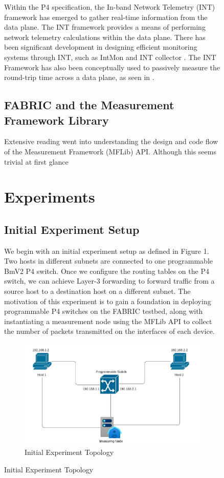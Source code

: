 \documentclass[conference]{IEEEtran}
\begin{document}
\begin{figure}[h!]
    Within the P4 specification, the In-band Network Telemetry (INT) framework \cite{b5} has emerged to gather real-time information from the data plane. The INT framework provides a means of performing network telemetry calculations within the data plane. There has been significant development in designing efficient monitoring systems through INT, such as IntMon \cite{b6} and INT collector \cite{b7}. The INT Framework has also been conceptually used to passively measure the round-trip time across a data plane, as seen in \cite{b8}.

    \subsection{FABRIC and the Measurement Framework Library}
    Extensive reading went into understanding the design and code flow of the Measurement Framework (MFLib) API. Although this seems trivial at first glance

    \section{Experiments}
    \subsection{Initial Experiment Setup}
    We begin with an initial experiment setup as defined in Figure 1. Two hosts in different subnets are connected to one programmable BmV2 P4 switch. Once we configure the routing tables on the P4 switch, we can achieve Layer-3 forwarding to forward traffic from a source host to a destination host on a different subnet. The motivation of this experiment is to gain a foundation in deploying programmable P4 switches on the FABRIC testbed, along with instantiating a measurement node using the MFLib API to collect the number of packets transmitted on the interfaces of each device.

   \begin{figure}[b]
        \includegraphics[scale=0.4]{Initial_Switch_Topology.jpeg}
        \centering
        \caption{Initial Experiment Topology}
    \end{figure}


\end{figure}
\end{document}
